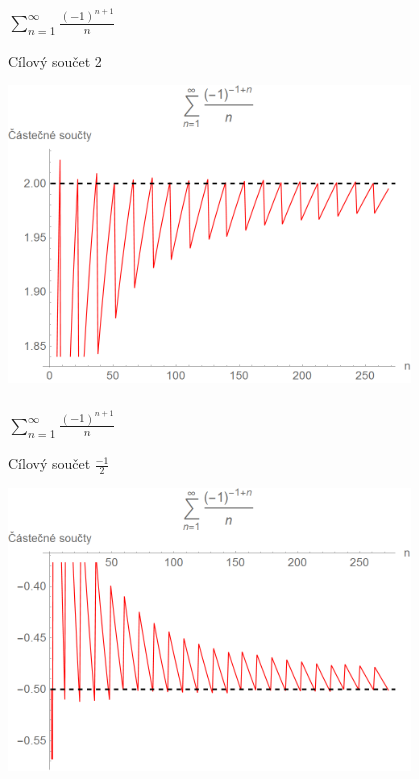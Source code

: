 \documentclass{beamer}
\begin{document}
\begin{frame}
  \frametitle{\(\sum _{n=1} ^{\infty} \frac{(-1)^{n+1}}{n}\)}
  Cílový součet 2
  \begin{center}
    \includegraphics[width=0.8\textwidth]{serie1_2.png}
  \end{center}
\end{frame}

\begin{frame}
  \frametitle{\(\sum _{n=1} ^{\infty} \frac{(-1)^{n+1}}{n}\)}
  Cílový součet \(\frac{-1}{2}\)
  \begin{center}
    \includegraphics[width=0.8\textwidth]{serie1_3.png}
  \end{center}
\end{frame}
\end{document}
